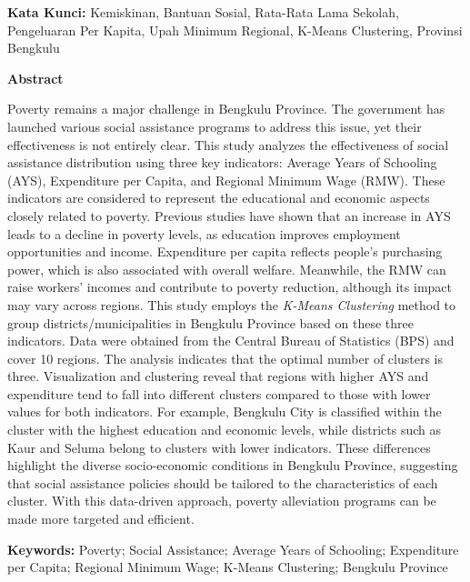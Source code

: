 \documentclass[12pt,a4paper]{article}
\begin{document}
\textbf{Kata Kunci:} Kemiskinan, Bantuan Sosial, Rata-Rata Lama Sekolah, Pengeluaran Per Kapita, Upah Minimum Regional, K-Means Clustering, Provinsi Bengkulu

\clearpage
 \begin{center}
    \bfseries Abstract
\end{center}
Poverty remains a major challenge in Bengkulu Province. The government has launched various social assistance programs to address this issue, yet their effectiveness is not entirely clear. This study analyzes the effectiveness of social assistance distribution using three key indicators: Average Years of Schooling (AYS), Expenditure per Capita, and Regional Minimum Wage (RMW). These indicators are considered to represent the educational and economic aspects closely related to poverty. Previous studies have shown that an increase in AYS leads to a decline in poverty levels, as education improves employment opportunities and income. Expenditure per capita reflects people’s purchasing power, which is also associated with overall welfare. Meanwhile, the RMW can raise workers’ incomes and contribute to poverty reduction, although its impact may vary across regions. This study employs the \textit{K-Means Clustering} method to group districts/municipalities in Bengkulu Province based on these three indicators. Data were obtained from the Central Bureau of Statistics (BPS) and cover 10 regions. The analysis indicates that the optimal number of clusters is three. Visualization and clustering reveal that regions with higher AYS and expenditure tend to fall into different clusters compared to those with lower values for both indicators. For example, Bengkulu City is classified within the cluster with the highest education and economic levels, while districts such as Kaur and Seluma belong to clusters with lower indicators. These differences highlight the diverse socio-economic conditions in Bengkulu Province, suggesting that social assistance policies should be tailored to the characteristics of each cluster. With this data-driven approach, poverty alleviation programs can be made more targeted and efficient.  

\textbf{Keywords:} Poverty; Social Assistance; Average Years of Schooling; Expenditure per Capita; Regional Minimum Wage; K-Means Clustering; Bengkulu Province
\end{document}
